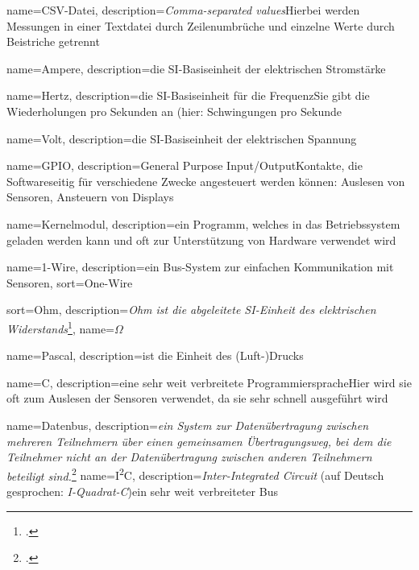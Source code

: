 {
  name=CSV-Datei,
  description={\textit{Comma-separated values}\newline Hierbei werden Messungen in einer Textdatei durch Zeilenumbrüche und einzelne Werte durch Beistriche getrennt}
}


{
  name=Ampere,
  description={die SI-Basiseinheit der elektrischen Stromstärke}
}

{
  name=Hertz,
  description={die SI-Basiseinheit für die Frequenz\newline Sie gibt die Wiederholungen pro Sekunden an (hier: Schwingungen pro Sekunde}
}

{
  name=Volt,
  description={die SI-Basiseinheit der elektrischen Spannung}
}

{
  name=GPIO,
  description={General Purpose Input/Output\newline Kontakte, die Softwareseitig für verschiedene Zwecke angesteuert werden können\newline \zB: Auslesen von Sensoren, Ansteuern von Displays}
}

{
  name=Kernelmodul,
  description={ein Programm, welches in das Betriebssystem geladen werden kann und oft zur Unterstützung von Hardware verwendet wird}
}

{
  name=1-Wire,
  description={ein \gls{Bus}-System zur einfachen Kommunikation mit Sensoren},
  sort=One-Wire
}

{
  sort=Ohm,
  description={\textit{Ohm ist die abgeleitete SI-Einheit des elektrischen Widerstands}\footcite{wiki_ohm}},
  name={\ensuremath{\Omega}}
}

{
  name=Pascal,
  description={ist die Einheit des (Luft-)Drucks}
}


{
  name=C,
  description={eine sehr weit verbreitete Programmiersprache\newline Hier wird sie oft zum Auslesen der Sensoren verwendet, da sie sehr schnell ausgeführt wird}
}

{
  name=Datenbus,
  description={\textit{ein System zur Datenübertragung zwischen mehreren Teilnehmern über einen gemeinsamen Übertragungsweg, bei dem die Teilnehmer nicht an der Datenübertragung zwischen anderen Teilnehmern beteiligt sind.}\footcite{wiki:bus}}
}
{
  name=I\textsuperscript{2}C,
  description={\textit{Inter-Integrated Circuit} (auf Deutsch gesprochen: \textit{I-Quadrat-C})\newline ein sehr weit verbreiteter \gls{Bus}}
}


